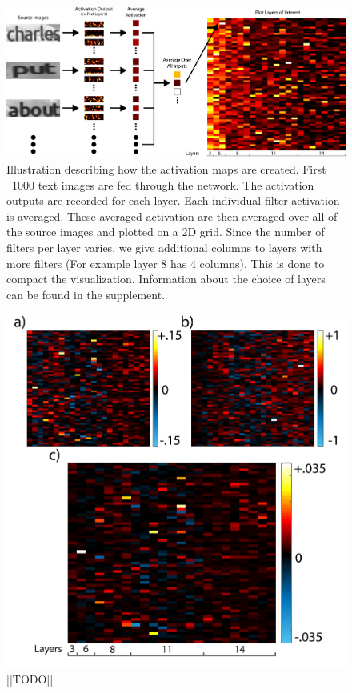 \documentclass[10pt,twocolumn,letterpaper]{article}
\begin{document}
\begin{figure}
\includegraphics[width=1\textwidth]{Figures/activations_map_overview/act_map_overview-01.png}
\caption{Illustration describing how the activation maps are created. First ~1000 text images are fed through the network. The activation outputs are recorded for each layer. Each individual filter activation is averaged. These averaged activation are then averaged over all of the source images and plotted on a 2D grid. Since the number of filters per layer varies, we give additional columns to layers with more filters (For example layer 8 has 4 columns). This is done to compact the visualization. Information about the choice of layers can be found in the supplement.}
\label{fig:subvis}
\end{figure}

\begin{figure}
\includegraphics[width=\columnwidth]{Figures/diff_comparisons/diff_comparison-01.png}
\caption{||TODO||}
\label{fig:diffmethods}
\end{figure}
\end{document}
